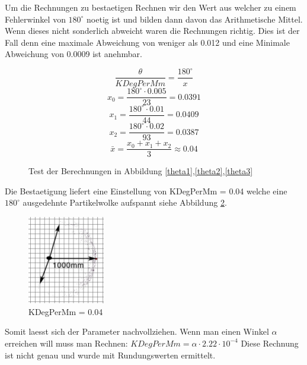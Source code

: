 \documentclass{article}
\begin{document}
Um die Rechnungen zu bestaetigen Rechnen wir den Wert aus welcher zu einem Fehlerwinkel von $180^\circ$ noetig ist und bilden dann davon das Arithmetische Mittel. Wenn dieses nicht sonderlich abweicht waren die Rechnungen richtig. Dies ist der Fall denn eine maximale Abweichung von weniger als 0.012 und eine Minimale Abweichung von 0.0009 ist anehmbar. 

\begin{figure}
	\begin{equation}\label{get0005Y}	
		\frac{\theta}{KDegPerMm}=\frac{180^\circ}{x}
	\end{equation}
	\begin{equation}\label{get0005Y}	
		{x_0}=\frac{180^\circ \cdot 0.005}{23}=0.0391
	\end{equation}
	\begin{equation}\label{get0005Y}	
		{x_1}=\frac{180^\circ \cdot 0.01}{44}=0.0409
	\end{equation}
	\begin{equation}\label{get0005Y}	
		{x_2}=\frac{180^\circ \cdot 0.02}{93}=0.0387
	\end{equation}
	\begin{equation}\label{get0005Y}
		\bar{x}=\frac{x_0+x_1+x_2}{3} \approx 0.04
	\end{equation}
  \caption{Test der Berechnungen in Abbildung \ref{theta1},\ref{theta2},\ref{theta3}}
  \label{KDegPerMm0005Calc}
\end{figure}

Die Bestaetigung liefert eine Einstellung von KDegPerMm = 0.04 welche eine $180^\circ$ ausgedehnte Partikelwolke aufspannt siehe Abbildung \ref{KDegPerMm004Test}.

\begin{figure}
	\centering
	\includegraphics[width=0.3\textwidth]{img/KDegPerMm004.jpg}
	\caption{KDegPerMm = 0.04}
	  \label{KDegPerMm004Test}
\end{figure}

Somit laesst sich der Parameter nachvollziehen. Wenn man einen Winkel $\alpha$ erreichen will muss man Rechnen: $KDegPerMm = \alpha \cdot 2.22 \cdot 10^{-4}$
Diese Rechnung ist nicht genau und wurde mit Rundungswerten ermittelt. 
\end{document}
